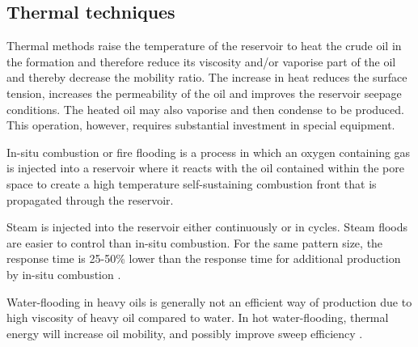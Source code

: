 \subsection{Thermal techniques}
Thermal methods raise the temperature of the reservoir to heat the crude oil in 
the formation and therefore reduce its viscosity and/or vaporise part of the oil 
and thereby decrease the mobility ratio. The increase in heat reduces the 
surface tension, increases the permeability of the oil and improves the 
reservoir seepage conditions. The heated oil may also vaporise and then condense 
to be produced. This operation, however, requires substantial investment in 
special equipment. 
\begin{description}[style=nextline]
\item[\textbf{In-situ combustion (ISC)}]
In-situ combustion or fire flooding is a process in 
which an oxygen containing gas is injected into a reservoir where it reacts with 
the oil contained within the pore space to create a high temperature 
self-sustaining combustion front that is propagated through the reservoir. 
\item[\textbf{Steam Injection}] 
Steam is injected into the reservoir either continuously or in 
cycles. %
Steam floods are easier to control than in-situ combustion. 
For the same pattern size, the response time is 25-50\% lower than the response 
time for additional production by in-situ combustion \citep{Jelmert}.
\item[\textbf{Hot water flooding}]
Water-flooding in heavy oils is generally not an efficient 
way of production due to high viscosity of heavy oil compared to water. In hot 
water-flooding, thermal energy will increase oil mobility, and possibly improve
sweep efficiency \citep{Kermen}. 

\end{description}
